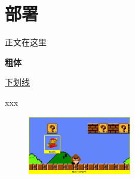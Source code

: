 \documentclass[../main.tex]{subfiles}
\begin{document}
\chapter{部署}

正文在这里

\textbf{粗体}

\uline{下划线}

xxx

\begin{figure}
\centering
\includegraphics[width=0.4\textwidth]{figures/agentenv.png}
\end{figure}
\end{document}
